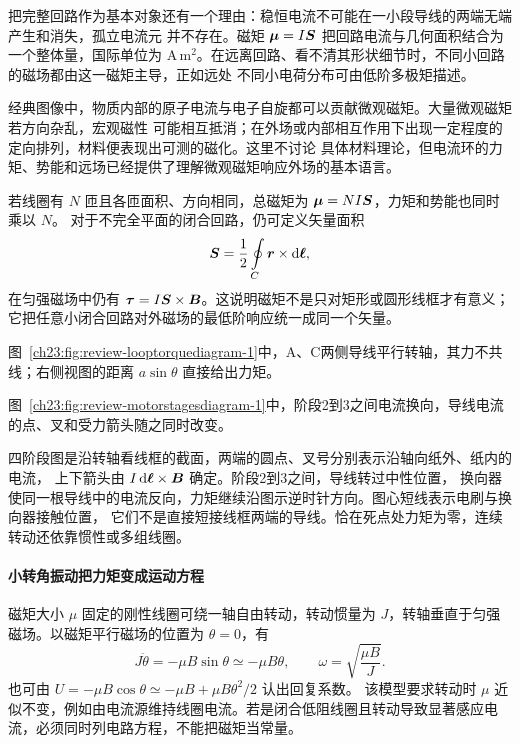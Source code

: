 {把完整回路作为基本对象还有一个理由：稳恒电流不可能在一小段导线的两端无端产生和消失，孤立电流元
并不存在。磁矩 $\bm{\mu}=I\bm{S}$ 把回路电流与几何面积结合为一个整体量，国际单位为
$\mathrm{A\,m^2}$。在远离回路、看不清其形状细节时，不同小回路的磁场都由这一磁矩主导，正如远处
不同小电荷分布可由低阶多极矩描述。

经典图像中，物质内部的原子电流与电子自旋都可以贡献微观磁矩。大量微观磁矩若方向杂乱，宏观磁性
可能相互抵消；在外场或内部相互作用下出现一定程度的定向排列，材料便表现出可测的磁化。这里不讨论
具体材料理论，但电流环的力矩、势能和远场已经提供了理解微观磁矩响应外场的基本语言。

若线圈有 $N$ 匝且各匝面积、方向相同，总磁矩为 $\bm{\mu}=NI\bm{S}$，力矩和势能也同时乘以 $N$。
对于不完全平面的闭合回路，仍可定义矢量面积
\begin{equation}
  \bm{S}=\frac12\oint\limits_C\bm{r}\times\mathop{}\!\mathrm d\bm{\ell},
\end{equation}
在匀强磁场中仍有 $\bm{\tau}=I\bm{S}\times\bm{B}$。这说明磁矩不是只对矩形或圆形线框才有意义；
它把任意小闭合回路对外磁场的最低阶响应统一成同一个矢量。

图~\ref{ch23:fig:review-looptorquediagram-1}中，A、C两侧导线平行转轴，其力不共线；右侧视图的距离 $a\sin\theta$ 直接给出力矩。
\par\noindent\begin{minipage}{\linewidth}
\loopTorqueDiagram
{}
\end{minipage}\par\medskip

图~\ref{ch23:fig:review-motorstagesdiagram-1}中，阶段2到3之间电流换向，导线电流的点、叉和受力箭头随之同时改变。
\par\noindent\begin{minipage}{\linewidth}
\motorStagesDiagram
{}
\end{minipage}\par\medskip
四阶段图是沿转轴看线框的截面，两端的圆点、叉号分别表示沿轴向纸外、纸内的电流，
上下箭头由 $I\mathop{}\!\mathrm d\bm{\ell}\times\bm{B}$ 确定。阶段2到3之间，导线转过中性位置，
换向器使同一根导线中的电流反向，力矩继续沿图示逆时针方向。图心短线表示电刷与换向器接触位置，
它们不是直接短接线框两端的导线。恰在死点处力矩为零，连续转动还依靠惯性或多组线圈。


\paragraph{小转角振动把力矩变成运动方程}
磁矩大小 $\mu$ 固定的刚性线圈可绕一轴自由转动，转动惯量为 $J$，转轴垂直于匀强磁场。以磁矩平行磁场的位置为 $\theta=0$，有
\[
 J\ddot\theta=-\mu B\sin\theta\simeq-\mu B\theta,
 \qquad \omega=\sqrt{\frac{\mu B}{J}}.
\]
也可由 $U=-\mu B\cos\theta\simeq-\mu B+\mu B\theta^2/2$ 认出回复系数。
该模型要求转动时 $\mu$ 近似不变，例如由电流源维持线圈电流。若是闭合低阻线圈且转动导致显著感应电流，必须同时列电路方程，不能把磁矩当常量。


}

